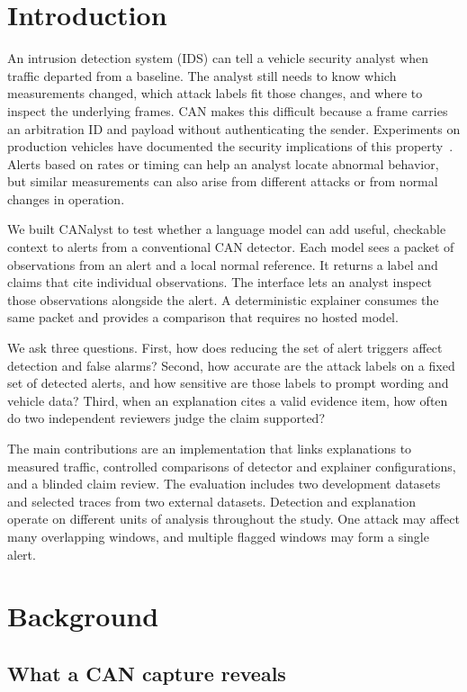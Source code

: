 \documentclass[sigconf,pbalance=true]{acmart}
\begin{document}
\section{Introduction}

An intrusion detection system (IDS) can tell a vehicle security analyst when traffic departed from a baseline. The analyst still needs to know which measurements changed, which attack labels fit those changes, and where to inspect the underlying frames. CAN makes this difficult because a frame carries an arbitration ID and payload without authenticating the sender. Experiments on production vehicles have documented the security implications of this property~\cite{koscher2010experimental}. Alerts based on rates or timing can help an analyst locate abnormal behavior, but similar measurements can also arise from different attacks or from normal changes in operation.

We built CANalyst to test whether a language model can add useful, checkable context to alerts from a conventional CAN detector. Each model sees a packet of observations from an alert and a local normal reference. It returns a label and claims that cite individual observations. The interface lets an analyst inspect those observations alongside the alert. A deterministic explainer consumes the same packet and provides a comparison that requires no hosted model.

We ask three questions. First, how does reducing the set of alert triggers affect detection and false alarms? Second, how accurate are the attack labels on a fixed set of detected alerts, and how sensitive are those labels to prompt wording and vehicle data? Third, when an explanation cites a valid evidence item, how often do two independent reviewers judge the claim supported?

The main contributions are an implementation that links explanations to measured traffic, controlled comparisons of detector and explainer configurations, and a blinded claim review. The evaluation includes two development datasets and selected traces from two external datasets. Detection and explanation operate on different units of analysis throughout the study. One attack may affect many overlapping windows, and multiple flagged windows may form a single alert.

\section{Background}

\subsection{What a CAN capture reveals}
\end{document}
